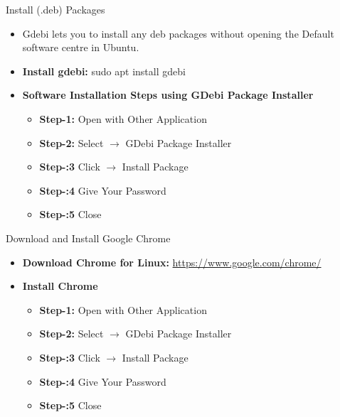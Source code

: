 \begin{frame}[t]{Install (.deb) Packages}
	\begin{itemize}
		\item Gdebi lets you to install any deb packages without opening the 
		Default software centre in Ubuntu.
		\item \textbf{Install gdebi:} sudo apt install gdebi
		\item \textbf{Software Installation Steps using GDebi  Package 
		Installer}
		\begin{itemize}
			\item \textbf{Step-1:}  Open with Other Application 
			\item \textbf{Step-2:}  Select $\rightarrow$ GDebi Package Installer
			\item \textbf{Step-:3}  Click $\rightarrow$ Install Package 
			\item \textbf{Step-:4}  Give Your Password 
			\item \textbf{Step-:5}  Close 
		\end{itemize}
	\end{itemize}
\end{frame}

\begin{frame}[t]{Download and Install Google Chrome}
	\begin{itemize}
		\item \textbf{Download Chrome for Linux:} 
		\url{https://www.google.com/chrome/}
		\item \textbf{Install Chrome} 
		\begin{itemize}
			\item \textbf{Step-1:}  Open with Other Application 
			\item \textbf{Step-2:}  Select $\rightarrow$ GDebi Package Installer
			\item \textbf{Step-:3}  Click $\rightarrow$ Install Package 
			\item \textbf{Step-:4}  Give Your Password 
			\item \textbf{Step-:5}  Close 
		\end{itemize}
	\end{itemize}
\end{frame}

